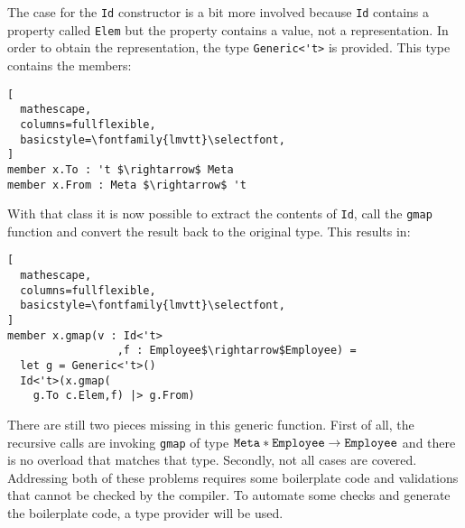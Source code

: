 \documentclass{sigplanconf}
\begin{document}
The case for the \verb+Id+ constructor is a bit more involved because
\verb+Id+ contains a property called \verb+Elem+ but the property
contains a value, not a representation. In order to obtain the
representation, the type \verb+Generic<'t>+ is provided. This type
contains the members:
\begin{lstlisting}[
  mathescape,
  columns=fullflexible,
  basicstyle=\fontfamily{lmvtt}\selectfont,
]
member x.To : 't $\rightarrow$ Meta
member x.From : Meta $\rightarrow$ 't
\end{lstlisting}
With that class it is now possible to extract the contents of
\verb+Id+, call the \verb+gmap+ function and convert the result back
to the original type. This results in:
\begin{lstlisting}[
  mathescape,
  columns=fullflexible,
  basicstyle=\fontfamily{lmvtt}\selectfont,
]
member x.gmap(v : Id<'t>
                 ,f : Employee$\rightarrow$Employee) =
  let g = Generic<'t>()
  Id<'t>(x.gmap(
    g.To c.Elem,f) |> g.From)
\end{lstlisting}
There are still two pieces missing in this generic function. First of
all, the recursive calls are invoking \verb+gmap+ of type
$\mathtt{Meta}*\mathtt{Employee}\rightarrow\mathtt{Employee}$ and there is no
overload that matches that type. Secondly, not all cases are
covered. Addressing both of these problems requires some boilerplate
code and validations that cannot be checked by the compiler. To
automate some checks and generate the boilerplate code, a type
provider will be used.
\end{document}
